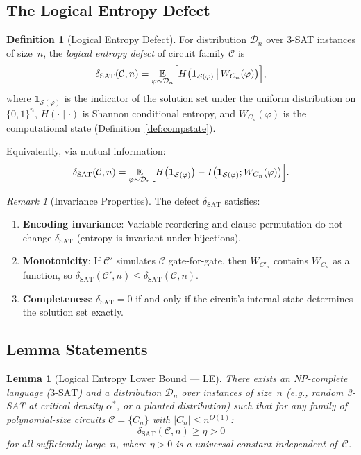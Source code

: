 \documentclass[11pt]{article}
\newtheorem{lemma}[theorem]{Lemma}
\theoremstyle{definition}
\newtheorem{definition}[theorem]{Definition}
\theoremstyle{remark}
\newtheorem{remark}[theorem]{Remark}
\newcommand{\calC}{\mathcal{C}}
\newcommand{\calD}{\mathcal{D}}
\newcommand{\calS}{\mathcal{S}}
\newcommand{\threeSAT}{\mathrm{3\text{-}SAT}}
\newcommand{\dSAT}{\delta_{\mathrm{SAT}}}
\begin{document}
\subsection{The Logical Entropy Defect}

\begin{definition}[Logical Entropy Defect]
\label{def:delta-SAT}
For distribution $\calD_n$ over 3-SAT instances of size~$n$, the
\emph{logical entropy defect} of circuit family $\calC$ is
\[
  \dSAT(\calC, n) =
  \underset{\varphi \sim \calD_n}{\mathbb{E}} \Bigl[
    H\bigl(\mathbf{1}_{\calS(\varphi)} \,\big|\, W_{C_n}(\varphi)\bigr)
  \Bigr],
\]
where $\mathbf{1}_{\calS(\varphi)}$ is the indicator of the solution set
under the uniform distribution on $\{0,1\}^n$, $H(\cdot \mid \cdot)$
is Shannon conditional entropy, and $W_{C_n}(\varphi)$ is the computational
state (Definition~\ref{def:compstate}).

Equivalently, via mutual information:
\[
  \dSAT(\calC, n) =
  \underset{\varphi \sim \calD_n}{\mathbb{E}} \Bigl[
    H\bigl(\mathbf{1}_{\calS(\varphi)}\bigr)
    - I\bigl(\mathbf{1}_{\calS(\varphi)} ; W_{C_n}(\varphi)\bigr)
  \Bigr].
\]
\end{definition}

\begin{remark}[Invariance Properties]
\label{rem:invariance}
The defect $\dSAT$ satisfies:
\begin{enumerate}
  \item \textbf{Encoding invariance}: Variable reordering and clause permutation
    do not change $\dSAT$ (entropy is invariant under bijections).
  \item \textbf{Monotonicity}: If $\calC'$ simulates $\calC$ gate-for-gate,
    then $W_{C'_n}$ contains $W_{C_n}$ as a function, so
    $\dSAT(\calC', n) \leq \dSAT(\calC, n)$.
  \item \textbf{Completeness}: $\dSAT = 0$ if and only if the circuit's
    internal state determines the solution set exactly.
\end{enumerate}
\end{remark}

\subsection{Lemma Statements}

\begin{lemma}[Logical Entropy Lower Bound --- LE]
\label{lem:LE}
There exists an NP-complete language ($\threeSAT$) and a distribution
$\calD_n$ over instances of size~$n$ (e.g., random 3-SAT at critical
density $\alpha^*$, or a planted distribution) such that for any family
of polynomial-size circuits $\calC = \{C_n\}$ with $|C_n| \leq n^{O(1)}$:
\[
  \dSAT(\calC, n) \geq \eta > 0
\]
for all sufficiently large~$n$, where $\eta > 0$ is a universal constant
independent of~$\calC$.
\end{lemma}
\end{document}
